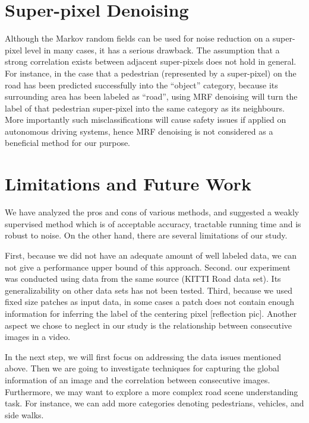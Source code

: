 \section{Super-pixel Denoising}
Although the Markov random fields can be used for noise reduction on a super-pixel level in many cases, it has a serious drawback. The assumption that a strong correlation exists between adjacent super-pixels does not hold in general. For instance, in the case that a pedestrian (represented by a super-pixel) on the road has been predicted successfully into the ``object'' category, because its surrounding area has been labeled as ``road'', using MRF denoising will turn the label of that pedestrian super-pixel into the same category as its neighbours. More importantly such misclassifications will cause safety issues if applied on autonomous driving systems, hence MRF denoising is not considered as a beneficial method for our purpose.

\section{Limitations and Future Work}
We have analyzed the pros and cons of various methods, and suggested a weakly supervised method which is of acceptable accuracy, tractable running time and is robust to noise. On the other hand, there are several limitations of our study. 

First, because we did not have an adequate amount of well labeled data, we can not give a performance upper bound of this approach. Second. our experiment was conducted using data from the same source (KITTI Road data set). Its generalizability on other data sets has not been tested. Third, because we used fixed size patches as input data, in some cases a patch does not contain enough information for inferring the label of the centering pixel [reflection pic]. Another aspect we chose to neglect in our study is the relationship between consecutive images in a video.
 
In the next step, we will first focus on addressing the data issues mentioned above. Then we are going to investigate techniques for capturing the global information of an image and the correlation between consecutive images. Furthermore, we may want to explore a more complex road scene understanding task. For instance, we can add more categories denoting pedestrians, vehicles, and side walks.